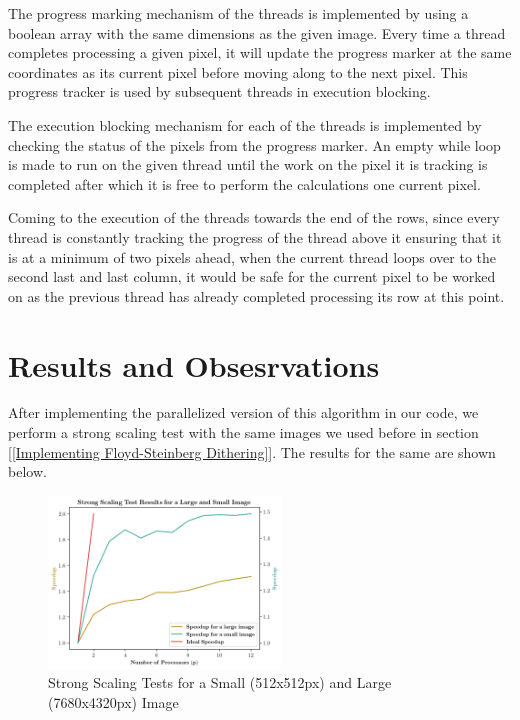 \documentclass{article}
\begin{document}
\medskip
\noindent The progress marking\cite{Hartley} mechanism of the threads is implemented by using a boolean array with the same dimensions as the given image. Every time a thread completes processing a given pixel, it will update the progress marker at the same coordinates as its current pixel before moving along to the next pixel. This progress tracker is used by subsequent threads in execution blocking.

\medskip
\noindent The execution blocking mechanism for each of the threads is implemented by checking the status of the pixels from the progress marker. An empty while loop is made to run on the given thread until the work on the pixel it is tracking is completed after which it is free to perform the calculations one current pixel.

\medskip
\noindent Coming to the execution of the threads towards the end of the rows, since every thread is constantly tracking the progress of the thread above it ensuring that it is at a minimum of two pixels ahead, when the current thread loops over to the second last and last column, it would be safe for the current pixel to be worked on  as the previous thread has already completed processing its row at this point.

\section{Results and Obsesrvations}

\noindent After implementing the parallelized version of this algorithm in our code, we perform a strong scaling test with the same images we used before in section [\ref{Implementing Floyd-Steinberg Dithering}]. The results for the same are shown below.

\begin{figure}[h]
    \centering
    \includegraphics[width=0.55\textwidth]{graphs/strong_scaling_test_plots.png}
    \caption{Strong Scaling Tests for a Small (512x512px) and Large (7680x4320px) Image}
    \label{fig:parallel_readings}
\end{figure}
\end{document}
